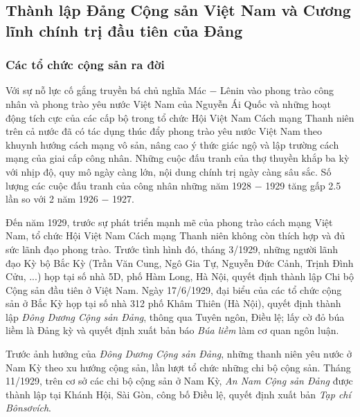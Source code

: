 \subsection{Thành lập Đảng Cộng sản Việt Nam và Cương lĩnh chính trị đầu tiên của Đảng}
\subsubsection{Các tổ chức cộng sản ra đời}
Với sự nỗ lực cố gắng truyền bá chủ nghĩa Mác $-$ Lênin vào phong trào công nhân và phong trào yêu nước Việt Nam của Nguyễn Ái Quốc và những hoạt động tích cực của các cấp bộ trong tổ chức Hội Việt Nam Cách mạng Thanh niên trên cả nước đã có tác dụng thúc đẩy phong trào yêu nước Việt Nam theo khuynh hướng cách mạng vô sản, nâng cao ý thức giác ngộ và lập trường cách mạng của giai cấp công nhân. Những cuộc đấu tranh của thợ thuyền khắp ba kỳ với nhịp độ, quy mô ngày càng lớn, nội dung chính trị ngày càng sâu sắc. Số lượng các cuộc đấu tranh của công nhân những năm 1928 $-$ 1929 tăng gấp 2.5 lần so với 2 năm 1926 $-$ 1927.

Đến năm 1929, trước sự phát triển mạnh mẽ của phong trào cách mạng Việt Nam, tổ chức Hội Việt Nam Cách mạng Thanh niên không còn thích hợp và đủ sức lãnh đạo phong trào. Trước tình hình đó, tháng 3/1929, những người lãnh đạo Kỳ bộ Bắc Kỳ (Trần Văn Cung, Ngô Gia Tự, Nguyễn Đức Cảnh, Trịnh Đình Cửu, ...) họp tại số nhà 5D, phố Hàm Long, Hà Nội, quyết định thành lập Chi bộ Cộng sản đầu tiên ở Việt Nam. Ngày 17/6/1929, đại biểu của các tổ chức cộng sản ở Bắc Kỳ họp tại số nhà 312 phố Khâm Thiên (Hà Nội), quyết định thành lập \textit{Đông Dương Cộng sản Đảng}, thông qua Tuyên ngôn, Điều lệ; lấy cờ đỏ búa liềm là Đảng kỳ và quyết định xuất bản báo \textit{Búa liềm} làm cơ quan ngôn luận.

Trước ảnh hưởng của \textit{Đông Dương Cộng sản Đảng}, những thanh niên yêu nước ở Nam Kỳ theo xu hướng cộng sản, lần lượt tổ chức những chi bộ cộng sản. Tháng 11/1929, trên cơ sở các chi bộ cộng sản ở Nam Kỳ, \textit{An Nam Cộng sản Đảng} được thành lập tại Khánh Hội, Sài Gòn, công bố Điều lệ, quyết định xuất bản \textit{Tạp chí Bônsơvích}.

